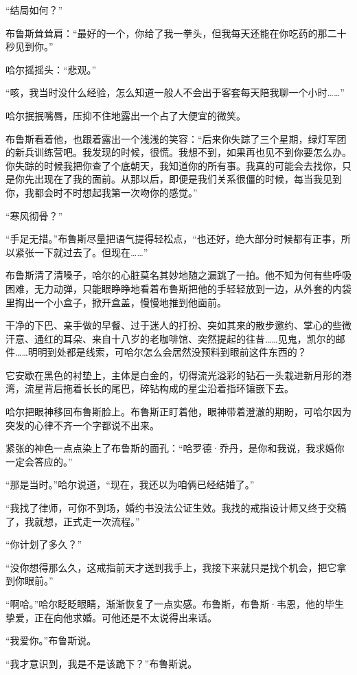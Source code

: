 \documentclass[../main]{subfiles}
\begin{document}
“结局如何？”

布鲁斯耸耸肩：“最好的一个，你给了我一拳头，但我每天还能在你吃药的那二十秒见到你。”

哈尔摇摇头：“悲观。”

“咳，我当时没什么经验，怎么知道一般人不会出于客套每天陪我聊一个小时……”

哈尔抿抿嘴唇，压抑不住地露出一个占了大便宜的微笑。

布鲁斯看着他，也跟着露出一个浅浅的笑容：“后来你失踪了三个星期，绿灯军团的新兵训练营吧。我发现的时候，很慌。我想不到，如果再也见不到你要怎么办。你失踪的时候我把你查了个底朝天，我知道你的所有事。我真的可能会去找你，只是你先出现在了我的面前。从那以后，即便是我们关系很僵的时候，每当我见到你，我都会时不时想起我第一次吻你的感觉。”

“寒风彻骨？”

“手足无措。”布鲁斯尽量把语气提得轻松点，“也还好，绝大部分时候都有正事，所以紧张一下就过去了。但现在……”

布鲁斯清了清嗓子，哈尔的心脏莫名其妙地随之漏跳了一拍。他不知为何有些呼吸困难，无力动弹，只能眼睁睁地看着布鲁斯把他的手轻轻放到一边，从外套的内袋里掏出一个小盒子，掀开盒盖，慢慢地推到他面前。

干净的下巴、亲手做的早餐、过于迷人的打扮、突如其来的散步邀约、掌心的些微汗意、通红的耳朵、来自十八岁的老咖啡馆、突然提起的往昔……见鬼，凯尔的邮件……明明到处都是线索，可哈尔怎么会居然没预料到眼前这件东西的？

它安歇在黑色的衬垫上，主体是白金的，切得流光溢彩的钻石一头栽进新月形的港湾，流星背后拖着长长的尾巴，碎钻构成的星尘沿着指环镶嵌下去。

哈尔把眼神移回布鲁斯脸上。布鲁斯正盯着他，眼神带着澄澈的期盼，可哈尔因为突发的心律不齐一个字都说不出来。

紧张的神色一点点染上了布鲁斯的面孔：“哈罗德·乔丹，是你和我说，我求婚你一定会答应的。”

“那是当时。”哈尔说道，“现在，我还以为咱俩已经结婚了。”

“我找了律师，可你不到场，婚约书没法公证生效。我找的戒指设计师又终于交稿了，我就想，正式走一次流程。”

“你计划了多久？”

“没你想得那么久，这戒指前天才送到我手上，我接下来就只是找个机会，把它拿到你眼前。”

“啊哈。”哈尔眨眨眼睛，渐渐恢复了一点实感。布鲁斯，布鲁斯·韦恩，他的毕生挚爱，正在向他求婚。可他还是不太说得出来话。

“我爱你。”布鲁斯说。

“我才意识到，我是不是该跪下？”布鲁斯说。
\end{document}
